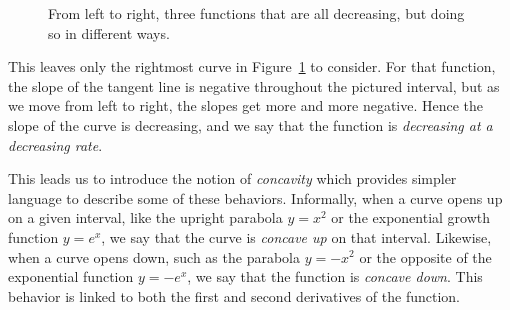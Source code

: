 \begin{figure}[h]
\begin{flushright}
\caption{From left to right, three functions that are all decreasing, but doing so in different ways.}\label{fig:2.3optsd}
\end{flushright}
\end{figure}

This leaves only the rightmost curve in Figure~\ref{fig:2.3optsd} to consider.  For that function, the slope of the tangent line is negative throughout the pictured interval, but as we move from left to right, the slopes get more and more negative.  Hence the slope of the curve is decreasing, and we say that the function is \emph{decreasing at a decreasing rate}.

This leads us to introduce the notion of \emph{concavity}  which provides simpler language to describe some of these behaviors.  Informally, when a curve opens up on a given interval, like the upright parabola $y = x^2$ or the exponential growth function $y = e^x$, we say that the curve is \emph{concave up} on that interval.  Likewise, when a curve opens down, such as the parabola $y = -x^2$ or the opposite of the exponential function $y = -e^{x}$, we say that the function is \emph{concave down}.  This behavior is linked to both the first and second derivatives of the function.  

